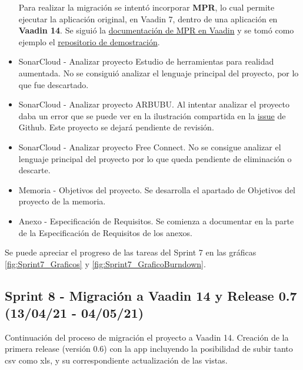 \begin{itemize}
		Para realizar la migración se intentó incorporar \textbf{MPR}, lo cual permite ejecutar la aplicación original, en Vaadin 7, dentro de una aplicación en \textbf{Vaadin 14}. Se siguió la \href{https://vaadin.com/docs/v14/tools/mpr/introduction/step-1-maven-v7}{documentación de MPR en Vaadin} y se tomó como ejemplo el \href{https://github.com/OlliTietavainenVaadin/mpr-demo/tree/v7}{repositorio de demostración}.
	\item SonarCloud - Analizar proyecto Estudio de herramientas para realidad aumentada. 
		No se consiguió analizar el lenguaje principal del proyecto, por lo que fue descartado.
	\item SonarCloud - Analizar proyecto ARBUBU. 
		Al intentar analizar el proyecto daba un error que se puede ver en la ilustración compartida en la \href{https://github.com/dbo1001/Gestor-TFG-2021/issues/73}{issue} de Github. Este proyecto se dejará pendiente de revisión.
	\item SonarCloud - Analizar proyecto Free Connect. 
		No se consigue analizar el lenguaje principal del proyecto por lo que queda pendiente de eliminación o descarte.
	\item Memoria - Objetivos del proyecto. 
		Se desarrolla el apartado de Objetivos del proyecto de la memoria.
	\item Anexo - Especificación de Requisitos. 
		Se comienza a documentar en la parte de la Especificación de Requisitos de los anexos.
\end{itemize}

Se puede apreciar el progreso de las tareas del Sprint 7 en las gráficas \ref{fig:Sprint7_Graficos} y \ref{fig:Sprint7_GraficoBurndown}.



\subsection{Sprint 8 - Migración a Vaadin 14 y Release 0.7 (13/04/21 - 04/05/21)}
Continuación del proceso de migración el proyecto a Vaadin 14. Creación de la primera release (versión 0.6) con la app incluyendo la posibilidad de subir tanto csv como xls, y su correspondiente actualización de las vistas.

